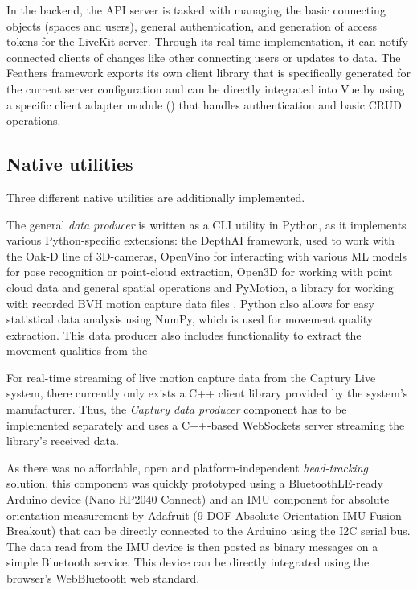 In the backend, the \ac{API} server is tasked with managing the basic connecting objects (spaces and users), general authentication, and generation of access tokens for the LiveKit server.
Through its real-time implementation, it can notify connected clients of changes like other connecting users or updates to data.
The Feathers framework exports its own client library that is specifically generated for the current server configuration and can be directly integrated into Vue by using a specific client adapter module () that handles authentication and basic \ac{CRUD} operations.

\subsection{Native utilities}

Three different native utilities are additionally implemented.

The general \emph{data producer} is written as a \ac{CLI} utility in Python, as it implements various Python-specific extensions: the DepthAI framework, used to work with the Oak-D line of \ac{3D}-cameras, OpenVino for interacting with various \ac{ML} models for pose recognition or point-cloud extraction, Open3D \parencite{open3DZhou2018} for working with point cloud data and general spatial operations and PyMotion, a library for working with recorded \ac{BVH} motion capture data files \parencite{githubPyMotion}.
Python also allows for easy statistical data analysis using NumPy, which is used for movement quality extraction.
This data producer also includes functionality to extract the movement qualities from the

For real-time streaming of live motion capture data from the Captury Live system, there currently only exists a C++ client library provided by the system's manufacturer.
Thus, the \emph{Captury data producer} component has to be implemented separately and uses a C++-based WebSockets server streaming the library's received data.

As there was no affordable, open and platform-independent \emph{head-tracking} solution, this component was quickly prototyped using a BluetoothLE-ready Arduino device (Nano RP2040 Connect) and an \ac{IMU} component for absolute orientation measurement by Adafruit (9-DOF Absolute Orientation IMU Fusion Breakout) that can be directly connected to the Arduino using the \ac{I2C} serial bus.
The data read from the \ac{IMU} device is then posted as binary messages on a simple Bluetooth service.
This device can be directly integrated using the browser's WebBluetooth web standard.

